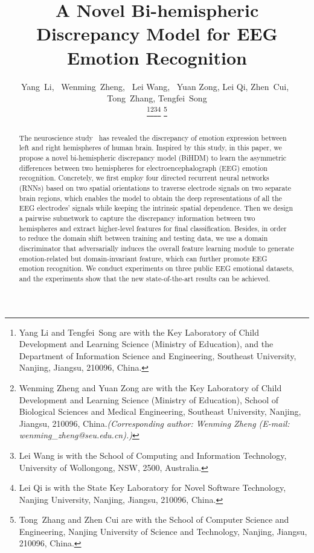 \documentclass[journal]{IEEEtran}
\begin{document}
\title{A Novel Bi-hemispheric Discrepancy Model for EEG Emotion Recognition}

\author{Yang~Li,~
	Wenming~Zheng,~
Lei Wang,~
Yuan Zong,
Lei Qi,
Zhen~Cui,~
Tong~Zhang,
Tengfei~Song


\thanks{Yang Li and Tengfei~Song are with the Key Laboratory of Child Development and Learning Science (Ministry of Education), and the Department of Information Science and Engineering, Southeast University, Nanjing, Jiangsu, 210096, China. \protect}\thanks{Wenming Zheng and Yuan Zong are with the Key Laboratory of Child Development and Learning Science (Ministry of Education), School of Biological Sciences and Medical Engineering,
Southeast University, Nanjing, Jiangsu, 210096, China.\protect \it{(Corresponding author: Wenming Zheng (E-mail: wenming\_zheng@seu.edu.cn).)}}\thanks{Lei Wang is with the School of Computing and Information Technology, University of Wollongong, NSW, 2500, Australia.\protect}\thanks{Lei Qi is with the State Key Laboratory for Novel Software Technology, Nanjing University, Nanjing, Jiangsu, 210096, China.}
\thanks{Tong~Zhang and Zhen Cui are with the School of Computer Science and Engineering, Nanjing University of Science and Technology, Nanjing, Jiangsu, 210096, China.\protect}
}



\maketitle
\begin{abstract}
	The neuroscience study~\cite{dimond1976differing} has revealed the discrepancy of emotion expression between left and right hemispheres of human brain. Inspired by this study, in this paper, we propose a novel bi-hemispheric discrepancy model (BiHDM) to learn the asymmetric differences between two hemispheres for electroencephalograph (EEG) emotion recognition. Concretely, we first employ four directed recurrent neural networks (RNNs) based on two spatial orientations to traverse electrode signals on two separate brain regions, which enables the model to obtain the deep representations of all the EEG electrodes' signals while keeping the intrinsic spatial dependence. Then we design a pairwise subnetwork to capture the discrepancy information between two hemispheres and extract higher-level features for final classification. Besides, in order to reduce the domain shift between training and testing data, we use a domain discriminator that adversarially induces the overall feature learning module to generate emotion-related but domain-invariant feature, which can further promote EEG emotion recognition. We conduct experiments on three public EEG emotional datasets, and the experiments show that the new state-of-the-art results can be achieved.
\end{abstract}
\end{document}
